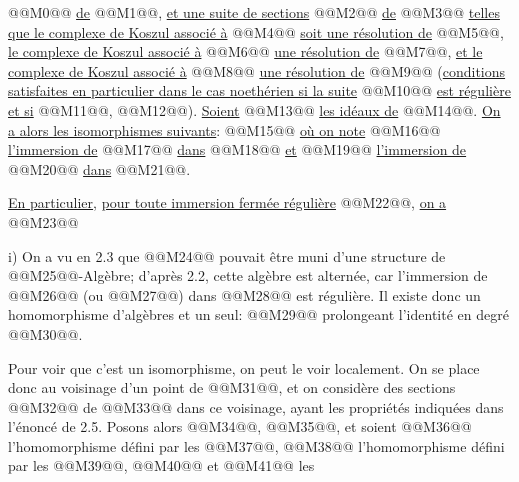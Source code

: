 
@@M0@@ \uline{de} @@M1@@, \uline{et une suite de sections} @@M2@@ \uline{de} @@M3@@ \uline{telles que le complexe de Koszul associé à} @@M4@@ \uline{soit une résolution de} @@M5@@, \uline{le complexe de Koszul associé à} @@M6@@ \uline{une résolution de} @@M7@@, \uline{et le complexe de Koszul associé à} @@M8@@ \uline{une résolution de} @@M9@@ (\uline{conditions satisfaites en particulier dans le cas noethérien si la suite} @@M10@@ \uline{est régulière et si} @@M11@@, @@M12@@). \uline{Soient} @@M13@@ \uline{les idéaux de} @@M14@@. \uline{On a alors les isomorphismes suivants}:
@@M15@@
\uline{où on note} @@M16@@ \uline{l'immersion de} @@M17@@ \uline{dans} @@M18@@ \uline{et} @@M19@@ \uline{l'immersion de} @@M20@@ \uline{dans} @@M21@@.

\uline{En particulier}, \uline{pour toute immersion fermée régulière} @@M22@@, \uline{on a}
@@M23@@

i) On a vu en 2.3 que @@M24@@ pouvait être muni d'une structure de @@M25@@-Algèbre; d'après 2.2, cette algèbre est alternée, car l'immersion de @@M26@@ (ou @@M27@@) dans @@M28@@ est régulière. Il existe donc un homomorphisme d'algèbres et un seul:
@@M29@@
prolongeant l'identité en degré @@M30@@.

Pour voir que c'est un isomorphisme, on peut le voir localement. On se place donc au voisinage d'un point de @@M31@@, et on considère des sections @@M32@@ de @@M33@@ dans ce voisinage, ayant les propriétés indiquées dans l'énoncé de 2.5. Posons alors @@M34@@, @@M35@@, et soient @@M36@@ l'homomorphisme défini par les @@M37@@, @@M38@@ l'homomorphisme défini par les @@M39@@, @@M40@@ et @@M41@@ les
